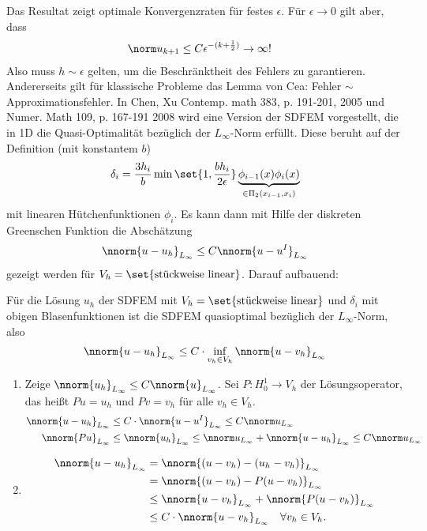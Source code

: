 Das Resultat zeigt optimale Konvergenzraten für festes $\epsilon$. Für $\epsilon \to 0$ gilt aber, dass
\begin{align*}
  \norm u_{k+1} &\leq C \epsilon^{- (k+ \frac 12)} \to \infty!
\end{align*}
Also muss $h \sim \epsilon$ gelten, um die Beschränktheit des Fehlers zu garantieren. Andererseits gilt für klassische Probleme das Lemma von Cea: Fehler $\sim$ Approximationsfehler. 
In Chen, Xu Contemp. math 383, p. 191-201, 2005 und Numer. Math 109, p. 167-191 2008 wird eine Version der SDFEM vorgestellt, die in 1D die Quasi-Optimalität bezüglich der $L_{\infty}$-Norm erfüllt. Diese beruht auf der Definition (mit konstantem $b$)
\begin{align*}
  \delta_{i} = \frac {3h_{i}} b \min \set{1, \frac{bh_{i}}{2\epsilon}}\underbrace{\phi_{i-1}(x) \phi_{i}(x)}_{\in \Pi_{2}(x_{i-1}, x_{i})}
\end{align*}
mit linearen Hütchenfunktionen $\phi_{i}$. Es kann dann mit Hilfe der diskreten Greenschen Funktion die Abschätzung
\begin{align*}
  \nnorm{u-u_{h}}_{L_{\infty}} \leq C  \nnorm{u-u^{I}}_{L_{\infty}} 
\end{align*}
gezeigt werden für $V_{h} = \set{\text{stückweise linear}}$. 
Darauf aufbauend:
\begin{satz}\label{thm:6-8}
  Für die Lösung $u_{h}$ der SDFEM mit $V_{h} = \set{\text{stückweise linear}}$ und $\delta_{i}$ mit obigen Blasenfunktionen ist die SDFEM quasioptimal bezüglich der $L_{\infty}$-Norm, also
  \begin{align*}
    \nnorm{u-u_{h}}_{L_{\infty}} \leq C\cdot \inf_{v_{h} \in V_{h}} \nnorm{u - v_{h}}_{L_{\infty}}
  \end{align*}
\end{satz}
\begin{beweis}
  \begin{enumerate}
  \item Zeige $\nnorm {u_{h}}_{L_{\infty}} \leq C \nnorm {u}_{L_{\infty}}$. 
    Sei $P: H_{0}^{1} \to V_{h}$ der Lösungsoperator, das heißt $Pu= u_{h}$ und $Pv= v_{h}$ für alle $v_{h} \in V_{h}$. 
    \begin{align*}
      \nnorm{u-u_{h}}_{L_{\infty}} &\leq C\cdot  \nnorm{u - u^{I}}_{L_{\infty}} \leq C \nnorm u _{L_{\infty}}\\
      \nnorm{Pu}_{L_{\infty}} &\leq \nnorm{u_{h}}_{L_{\infty}} \leq \nnorm u_{L_{\infty}}  + \nnorm{u - u_{h}}_{L_{\infty}} \leq C \nnorm u _{L_{\infty}}\\
    \end{align*}
  \item
    \begin{align*}
      \nnorm{u-u_{h}}_{L_{\infty}} &= \nnorm{(u - v_{h}) - (u_{h} - v_{h})}_{L_{\infty}}\\
      &= \nnorm{(u - v_{h}) - P(u - v_{h})}_{L_{\infty}}\\
      &\leq \nnorm{u - v_{h}}_{L_{\infty}} + \nnorm{P(u - v_{h})}_{L_{\infty}}\\
      &\leq C \cdot\nnorm{u - v_{h}}_{L_{\infty}} \quad \forall v_{h} \in V_{h}. 
    \end{align*}
  \end{enumerate}
\end{beweis}
